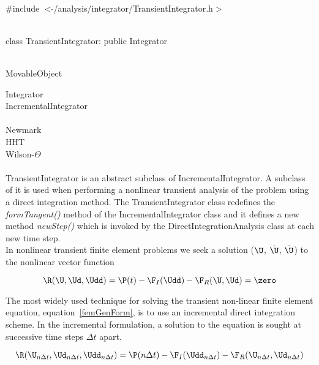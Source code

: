 
   \\
\#include $<\tilde{ }$/analysis/integrator/TransientIntegrator.h$>$  


  \\
class TransientIntegrator: public Integrator  


 \\
MovableObject 

\indent\indent Integrator \\
\indent\indent\indent IncrementalIntegrator \\
\indent\indent\indent{} \\
\indent\indent\indent\indent\indent Newmark \\
\indent\indent\indent\indent\indent HHT \\
\indent\indent\indent\indent\indent Wilson-$\Theta$ \\

 \\ 
\indent TransientIntegrator is an abstract subclass of IncrementalIntegrator.
A subclass of it is used when performing a nonlinear transient
analysis of the problem using a direct integration method. The
TransientIntegrator class redefines the {\em formTangent()} method of
the IncrementalIntegrator class and it defines a new method {\em
newStep()} which is invoked by the DirectIntegrationAnalysis class at
each new time step.  \\

In nonlinear transient finite element problems we seek a solution
($\U$, $\dot \U$, $\ddot \U$) to the nonlinear vector function

\begin{equation}
\R(\U,\Ud, \Udd) = \P(t) - \F_I(\Udd) - \F_R(\U, \Ud) = \zero
\label{femGenForm}
\end{equation}


The most widely used technique for solving the transient non-linear 
finite element equation, equation~\ref{femGenForm}, is to use an
incremental direct integration scheme. In the incremental formulation,
a solution to the equation is sought at successive time steps $\Delta
t$ apart.  

\begin{equation}
\R(\U_{n \Delta t},\Ud_{n \Delta t}, \Udd_{n \Delta t}) = \P(n \Delta t) -
\F_I(\Udd_{n \Delta t}) - \F_R(\U_{n \Delta t}, \Ud_{n \Delta t})
\label{fullTimeForm}
\end{equation}

